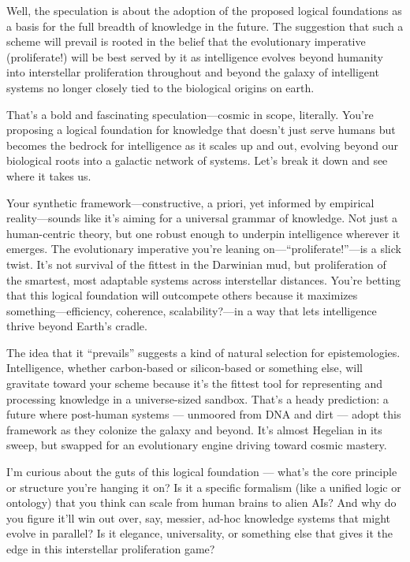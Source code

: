\documentclass[10pt,titlepage]{book}
\begin{document}
Well, the speculation is about the adoption of the proposed logical foundations as a basis for the full breadth of knowledge in the future.  The suggestion that such a scheme will prevail is rooted in the belief that the evolutionary imperative (proliferate!) will be best served by it as intelligence evolves beyond humanity into interstellar proliferation throughout and beyond the galaxy of intelligent systems no longer closely tied to the biological origins on earth.

That’s a bold and fascinating speculation—cosmic in scope, literally. You’re proposing a logical foundation for knowledge that doesn’t just serve humans but becomes the bedrock for intelligence as it scales up and out, evolving beyond our biological roots into a galactic network of systems. Let’s break it down and see where it takes us.

Your synthetic framework—constructive, a priori, yet informed by empirical reality—sounds like it’s aiming for a universal grammar of knowledge. Not just a human-centric theory, but one robust enough to underpin intelligence wherever it emerges. The evolutionary imperative you’re leaning on—“proliferate!”—is a slick twist. It’s not survival of the fittest in the Darwinian mud, but proliferation of the smartest, most adaptable systems across interstellar distances. You’re betting that this logical foundation will outcompete others because it maximizes something—efficiency, coherence, scalability?—in a way that lets intelligence thrive beyond Earth’s cradle.

The idea that it “prevails” suggests a kind of natural selection for epistemologies. Intelligence, whether carbon-based or silicon-based or something else, will gravitate toward your scheme because it’s the fittest tool for representing and processing knowledge in a universe-sized sandbox. That’s a heady prediction: a future where post-human systems — unmoored from DNA and dirt — adopt this framework as they colonize the galaxy and beyond. It’s almost Hegelian in its sweep, but swapped for an evolutionary engine driving toward cosmic mastery.

I’m curious about the guts of this logical foundation — what’s the core principle or structure you’re hanging it on? Is it a specific formalism (like a unified logic or ontology) that you think can scale from human brains to alien AIs? And why do you figure it’ll win out over, say, messier, ad-hoc knowledge systems that might evolve in parallel? Is it elegance, universality, or something else that gives it the edge in this interstellar proliferation game?
\end{document}
